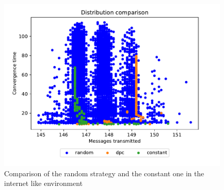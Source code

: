 \documentclass[10pt,conference,letterpaper]{IEEEtran}
\newcommand{\figwidth}{0.78}
\newcommand{\figvspace}{-1.5em}
\begin{document}
\begin{figure}[tb]
	\centering
	\includegraphics[width=\figwidth\columnwidth]{images/internet_like/combine_results_3}
	\caption{Comparison of the random strategy and the constant one in the internet like environment}
	\label{fig:internet_pareto_comparison}
	\vspace{\figvspace}
\end{figure}



\end{document}
